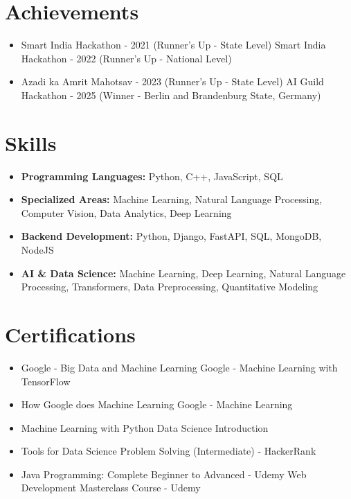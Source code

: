 \documentclass[a4paper,10pt]{article}
\begin{document}
\section*{Achievements}
\begin{itemize}
\item Smart India Hackathon - 2021 (Runner's Up - State Level) \hfill Smart India Hackathon - 2022 (Runner's Up - National Level)
\item Azadi ka Amrit Mahotsav - 2023 (Runner's Up - State Level) \hfill AI Guild Hackathon - 2025 (Winner - Berlin and Brandenburg State, Germany)
\end{itemize}

\section*{Skills}
\begin{itemize}
  \item \textbf{Programming Languages:} Python, C++, JavaScript, SQL
  \item \textbf{Specialized Areas:} Machine Learning, Natural Language Processing, Computer Vision, Data Analytics, Deep Learning
  \item \textbf{Backend Development:} Python, Django, FastAPI, SQL, MongoDB, NodeJS
  \item \textbf{AI \& Data Science:} Machine Learning, Deep Learning, Natural Language Processing, Transformers, Data Preprocessing, Quantitative Modeling
\end{itemize}

\section*{Certifications}
\begin{itemize}
\item Google - Big Data and Machine Learning \hfill Google - Machine Learning with TensorFlow
\item How Google does Machine Learning \hfill Google - Machine Learning
\item Machine Learning with Python \hfill Data Science Introduction
\item Tools for Data Science \hfill Problem Solving (Intermediate) - HackerRank
\item Java Programming: Complete Beginner to Advanced - Udemy \hfill Web Development Masterclass Course - Udemy
\end{itemize}
\end{document}
